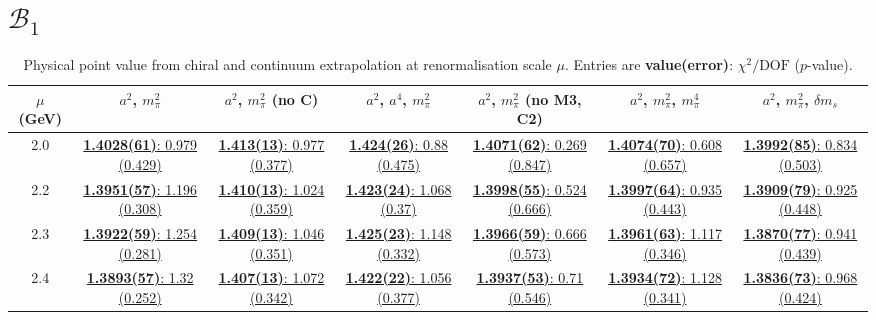 \documentclass[12pt]{extarticle}
\begin{document}
\clearpage
\section{$\mathcal{B}_1$}
\begin{table}[h!]
\begin{center}
\begin{tabular}{|c|c|c|c|c|c|c|}
\hline
$\mu$ (GeV) & $a^2$, $m_\pi^2$& $a^2$, $m_\pi^2$ (no C)& $a^2$, $a^4$, $m_\pi^2$& $a^2$, $m_\pi^2$ (no M3, C2)& $a^2$, $m_\pi^2$, $m_\pi^4$& $a^2$, $m_\pi^2$, $\delta m_s$\\
\hline
2.0& \hyperlink{VVpAA/SUSY/a2m2_20.pdf.1}{\textbf{1.4028(61)}: 0.979 (0.429)} & \hyperlink{VVpAA/SUSY/a2m2noC_20.pdf.1}{\textbf{1.413(13)}: 0.977 (0.377)} & \hyperlink{VVpAA/SUSY/a2a4m2_20.pdf.1}{\textbf{1.424(26)}: 0.88 (0.475)} & \hyperlink{VVpAA/SUSY/a2m2mcut_20.pdf.1}{\textbf{1.4071(62)}: 0.269 (0.847)} & \hyperlink{VVpAA/SUSY/a2m2m4_20.pdf.1}{\textbf{1.4074(70)}: 0.608 (0.657)} & \hyperlink{VVpAA/SUSY/a2m2delm_20.pdf.1}{\textbf{1.3992(85)}: 0.834 (0.503)}\\
2.2& \hyperlink{VVpAA/SUSY/a2m2_22.pdf.1}{\textbf{1.3951(57)}: 1.196 (0.308)} & \hyperlink{VVpAA/SUSY/a2m2noC_22.pdf.1}{\textbf{1.410(13)}: 1.024 (0.359)} & \hyperlink{VVpAA/SUSY/a2a4m2_22.pdf.1}{\textbf{1.423(24)}: 1.068 (0.37)} & \hyperlink{VVpAA/SUSY/a2m2mcut_22.pdf.1}{\textbf{1.3998(55)}: 0.524 (0.666)} & \hyperlink{VVpAA/SUSY/a2m2m4_22.pdf.1}{\textbf{1.3997(64)}: 0.935 (0.443)} & \hyperlink{VVpAA/SUSY/a2m2delm_22.pdf.1}{\textbf{1.3909(79)}: 0.925 (0.448)}\\
2.3& \hyperlink{VVpAA/SUSY/a2m2_23.pdf.1}{\textbf{1.3922(59)}: 1.254 (0.281)} & \hyperlink{VVpAA/SUSY/a2m2noC_23.pdf.1}{\textbf{1.409(13)}: 1.046 (0.351)} & \hyperlink{VVpAA/SUSY/a2a4m2_23.pdf.1}{\textbf{1.425(23)}: 1.148 (0.332)} & \hyperlink{VVpAA/SUSY/a2m2mcut_23.pdf.1}{\textbf{1.3966(59)}: 0.666 (0.573)} & \hyperlink{VVpAA/SUSY/a2m2m4_23.pdf.1}{\textbf{1.3961(63)}: 1.117 (0.346)} & \hyperlink{VVpAA/SUSY/a2m2delm_23.pdf.1}{\textbf{1.3870(77)}: 0.941 (0.439)}\\
2.4& \hyperlink{VVpAA/SUSY/a2m2_24.pdf.1}{\textbf{1.3893(57)}: 1.32 (0.252)} & \hyperlink{VVpAA/SUSY/a2m2noC_24.pdf.1}{\textbf{1.407(13)}: 1.072 (0.342)} & \hyperlink{VVpAA/SUSY/a2a4m2_24.pdf.1}{\textbf{1.422(22)}: 1.056 (0.377)} & \hyperlink{VVpAA/SUSY/a2m2mcut_24.pdf.1}{\textbf{1.3937(53)}: 0.71 (0.546)} & \hyperlink{VVpAA/SUSY/a2m2m4_24.pdf.1}{\textbf{1.3934(72)}: 1.128 (0.341)} & \hyperlink{VVpAA/SUSY/a2m2delm_24.pdf.1}{\textbf{1.3836(73)}: 0.968 (0.424)}\\
\hline
\end{tabular}
\caption{Physical point value from chiral and continuum extrapolation at renormalisation scale $\mu$. Entries are \textbf{value(error)}: $\chi^2/\text{DOF}$ ($p$-value).}
\end{center}
\end{table}
\end{document}
